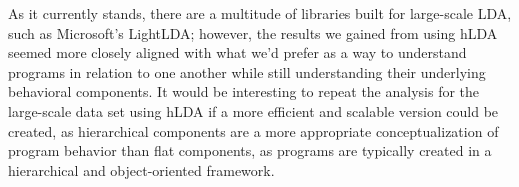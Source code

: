 As it currently stands, there are a multitude of libraries built for large-scale LDA, such as Microsoft's LightLDA; however, the results we gained from using hLDA seemed more closely aligned with what we'd prefer as a way to understand programs in relation to one another while still understanding their underlying behavioral components. It would be interesting to repeat the analysis for the large-scale data set using hLDA if a more efficient and scalable version could be created, as hierarchical components are a more appropriate conceptualization of program behavior than flat components, as programs are typically created in a hierarchical and object-oriented framework.